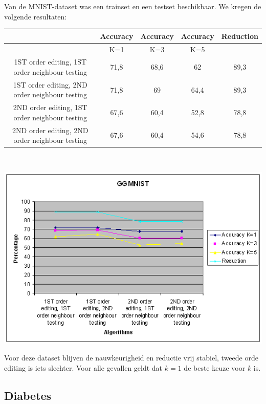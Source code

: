 \documentclass{article}
\begin{document}
Van de MNIST-dataset was een trainset en een testset beschikbaar. We kregen de volgende resultaten:\\
\begin{tabular}{|c|c|c|c|c|}  \hline
	& Accuracy	&Accuracy &Accuracy &	Reduction \\ \hline
	& K=1 &	K=3 &	K=5	& \\ \hline
1ST order editing, 1ST order neighbour testing &	71,8	& 68,6	& 62	& 89,3 \\
1ST order editing, 2ND order neighbour testing &	71,8	& 69 &	64,4 &	89,3 \\
2ND order editing, 1ST order neighbour testing &	67,6	& 60,4 &	52,8 &	78,8 \\
2ND order editing, 2ND order neighbour testing &	67,6	& 60,4 &	54,6	& 78,8 \\ \hline
\end{tabular} \\
\begin{center} \includegraphics[scale=0.7]{GG_MNIST} \end{center}

Voor deze dataset blijven de nauwkeurigheid en reductie vrij stabiel, tweede orde editing is iets slechter. Voor alle gevallen geldt dat $k=1$ de beste keuze voor $k$ is.

\subsection{Diabetes}
\end{document}
